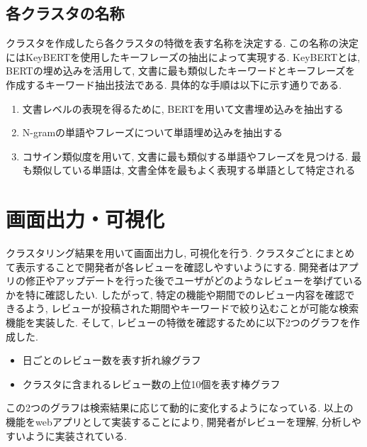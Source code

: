 \subsection{各クラスタの名称}
クラスタを作成したら各クラスタの特徴を表す名称を決定する. 
この名称の決定にはKeyBERT\cite{keybert}を使用したキーフレーズの抽出によって実現する. KeyBERTとは, BERTの埋め込みを活用して, 文書に最も類似したキーワードとキーフレーズを作成するキーワード抽出技法である. 
具体的な手順は以下に示す通りである. 

\begin{enumerate}
  \item 文書レベルの表現を得るために, BERTを用いて文書埋め込みを抽出する
  \item N-gramの単語やフレーズについて単語埋め込みを抽出する
  \item コサイン類似度を用いて, 文書に最も類似する単語やフレーズを見つける. 最も類似している単語は, 文書全体を最もよく表現する単語として特定される
\end{enumerate}


\section{画面出力・可視化}
クラスタリング結果を用いて画面出力し, 可視化を行う. クラスタごとにまとめて表示することで開発者が各レビューを確認しやすいようにする. 
開発者はアプリの修正やアップデートを行った後でユーザがどのようなレビューを挙げているかを特に確認したい. したがって, 特定の機能や期間でのレビュー内容を確認できるよう, レビューが投稿された期間やキーワードで絞り込むことが可能な検索機能を実装した. 
そして, レビューの特徴を確認するために以下2つのグラフを作成した.
\begin{itemize}
  \item 日ごとのレビュー数を表す折れ線グラフ
  \item クラスタに含まれるレビュー数の上位10個を表す棒グラフ
\end{itemize}
この2つのグラフは検索結果に応じて動的に変化するようになっている. 以上の機能をwebアプリとして実装することにより, 開発者がレビューを理解, 分析しやすいように実装されている. 